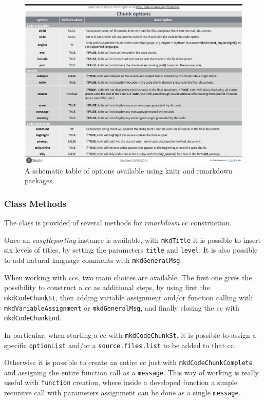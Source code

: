 \begin{figure}[H]
\centering
\includegraphics[width=\textwidth, keepaspectratio]{img/rr/knitropts.png}
\caption[knitr options]{A schematic table of options available using knitr and rmarkdown packages.}
\label{fig:knitropts}
\end{figure}


\subsubsection{Class Methods}

The class is provided of several methods for \textit{rmarkdown} \gls{cc} construction.

Once an \textit{easyReporting} instance is available, with \lstinline!mkdTitle! it is possible to insert six levels of titles, by setting the parameters \lstinline!title! and \lstinline!level!.
It is also possible to add natural language comments with \lstinline!mkdGeneralMsg!.

When working with \glspl{cc}, two main choices are available.
The first one gives the possibility to construct a \gls{cc} as additional steps, by using first the \lstinline!mkdCodeChunkSt!, then adding variable assignment and/or function calling with \lstinline!mkdVariableAssignment! or \lstinline!mkdGeneralMsg!, and finally closing the \gls{cc} with \lstinline!mkdCodeChunkEnd!.

In particular, when starting a \gls{cc} with \lstinline!mkdCodeChunkSt!, it is possible to assign a specific \lstinline!optionList! and/or a \lstinline!source.files.list! to be added to that \gls{cc}.

Otherwise it is possible to create an entire \gls{cc} just with \lstinline!mkdCodeChunkComplete! and assigning the entire function call as a \lstinline!message!.
This way of working is really useful with \lstinline!function! creation, where inside a developed function a simple recursive call with parameters assignment can be done as a single \lstinline!message!.




